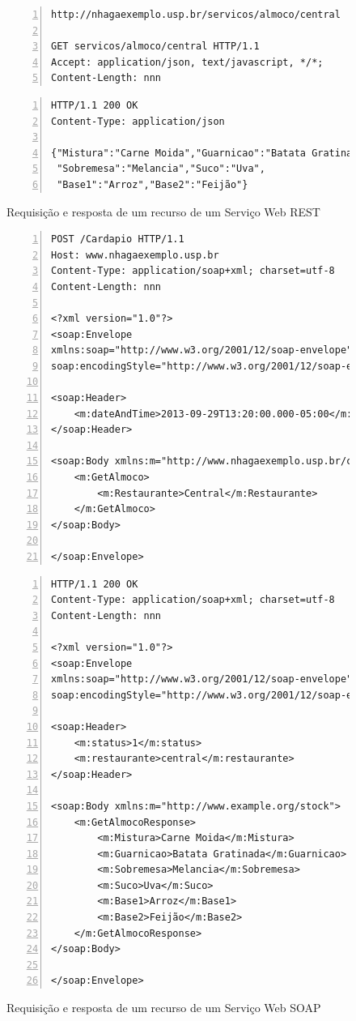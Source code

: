 \begin{figure}[H] 
\begin{Verbatim}[frame=single,fontsize=\footnotesize,framesep=3mm,label=requisição,numbers=left,numbersep=1mm]
http://nhagaexemplo.usp.br/servicos/almoco/central

GET servicos/almoco/central HTTP/1.1
Accept: application/json, text/javascript, */*;
Content-Length: nnn

\end{Verbatim}
\begin{Verbatim}[frame=single,fontsize=\footnotesize,framesep=3mm,label=resposta,numbers=left,numbersep=1mm]
HTTP/1.1 200 OK
Content-Type: application/json

{"Mistura":"Carne Moida","Guarnicao":"Batata Gratinada",
 "Sobremesa":"Melancia","Suco":"Uva",
 "Base1":"Arroz","Base2":"Feijão"}
\end{Verbatim}
\caption{Requisição e resposta de um recurso de um Serviço Web REST}
\label{fig:rest_msg}
\end{figure}

\begin{figure}[H]
\begin{Verbatim}[frame=single,fontsize=\footnotesize,framesep=3mm,label=requisição,numbers=left,numbersep=1mm]
POST /Cardapio HTTP/1.1
Host: www.nhagaexemplo.usp.br
Content-Type: application/soap+xml; charset=utf-8
Content-Length: nnn

<?xml version="1.0"?>
<soap:Envelope
xmlns:soap="http://www.w3.org/2001/12/soap-envelope"
soap:encodingStyle="http://www.w3.org/2001/12/soap-encoding">

<soap:Header>
    <m:dateAndTime>2013-09-29T13:20:00.000-05:00</m:dateAndTime>
</soap:Header>

<soap:Body xmlns:m="http://www.nhagaexemplo.usp.br/cardapio">
    <m:GetAlmoco>
        <m:Restaurante>Central</m:Restaurante>
    </m:GetAlmoco>
</soap:Body>

</soap:Envelope>
\end{Verbatim}

\begin{Verbatim}[frame=single,fontsize=\scriptsize,framesep=3mm,label=resposta,numbers=left,numbersep=1mm]
HTTP/1.1 200 OK
Content-Type: application/soap+xml; charset=utf-8
Content-Length: nnn

<?xml version="1.0"?>
<soap:Envelope
xmlns:soap="http://www.w3.org/2001/12/soap-envelope"
soap:encodingStyle="http://www.w3.org/2001/12/soap-encoding">

<soap:Header>
    <m:status>1</m:status>
    <m:restaurante>central</m:restaurante>
</soap:Header>

<soap:Body xmlns:m="http://www.example.org/stock">
    <m:GetAlmocoResponse>
        <m:Mistura>Carne Moida</m:Mistura>
	    <m:Guarnicao>Batata Gratinada</m:Guarnicao>
	    <m:Sobremesa>Melancia</m:Sobremesa>
	    <m:Suco>Uva</m:Suco>
	    <m:Base1>Arroz</m:Base1>
	    <m:Base2>Feijão</m:Base2>
    </m:GetAlmocoResponse>
</soap:Body>

</soap:Envelope>
\end{Verbatim}
\caption{Requisição e resposta de um recurso de um Serviço Web SOAP}
\label{fig:soap_msg}
\end{figure}

